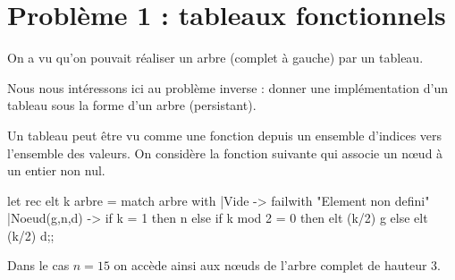 \section{Problème 1 : tableaux fonctionnels}
On a vu qu'on pouvait réaliser un arbre (complet à gauche) par un tableau.

Nous nous intéressons ici au problème inverse : donner une implémentation d'un tableau sous la forme d'un arbre (persistant).

Un tableau peut être vu comme une fonction depuis un ensemble d'indices vers l'ensemble des valeurs. On considère la fonction suivante qui associe un nœud à un entier non nul.

\begin{ocaml}
let rec elt k arbre =
  match arbre with
  |Vide -> failwith "Element non defini"
  |Noeud(g,n,d) -> if k = 1 then n
                            else if k mod 2 = 0
                                 then elt (k/2) g else elt (k/2) d;;
\end{ocaml}

Dans le cas $n=15$ on accède ainsi aux nœuds de l'arbre complet de hauteur 3.

